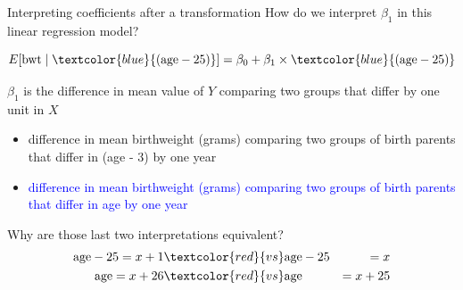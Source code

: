 \documentclass[10pt,t]{beamer}
\begin{document}
\begin{frame}{Interpreting coefficients after a transformation}
How do we interpret $\beta_1$ in this linear regression model?

$$
E[\text{bwt} \mid \textcolor{blue}{(\text{age} - 25)}] = \beta_0 + \beta_1 \times \textcolor{blue}{(\text{age} - 25)}
$$

\vspace{0.2cm}

$\beta_1$ is the difference in mean value of $Y$ comparing two groups that differ by one unit in $X$

\begin{itemize}
	\item[] difference in mean birthweight (grams) comparing two groups of birth parents that differ in (age - 3) by one year
	\item[] \textcolor{blue}{difference in mean birthweight (grams) comparing two groups of birth parents that differ in age by one year}
\end{itemize} 

\vspace{0.3cm}

Why are those last two interpretations equivalent?
\begin{align*}
\text{age} - 25 = x + 1 & \textcolor{red}{vs}  \text{age} - 25 &= x\\
\text{age} = x + 26 & \textcolor{red}{vs}  \text{age}  &= x + 25
\end{align*}

\end{frame}
\end{document}
